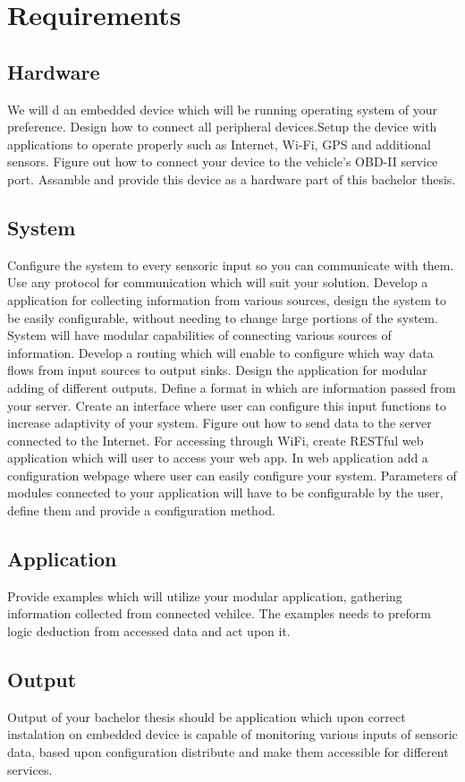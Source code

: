 \section{Requirements}

\subsection{Hardware}
We will d an embedded device which will be running operating system of your preference. Design how to connect all peripheral devices.Setup the device with applications to operate properly such as Internet, Wi-Fi, GPS and additional sensors. Figure out how to connect your device to the vehicle's OBD-II service port. Assamble and provide this device as a hardware part of this bachelor thesis.
\subsection{System}
Configure the system to every sensoric input so you can communicate with them. Use any protocol for communication which will suit your solution. Develop a application for collecting information from various sources, design the system to be easily configurable, without needing to change large portions of the system. System will have modular capabilities of connecting various sources of information. Develop a routing which will enable to configure which way data flows from input sources to output sinks. Design the application for modular adding of different outputs. Define a format in which are information passed from your server. Create an interface where user can configure this input functions to increase adaptivity of your system. Figure out how to send data to the server connected to the Internet. For accessing through WiFi, create RESTful web application which will user to access your web app. In web application add a configuration webpage where user can easily configure your system. Parameters of modules connected to your application will have to be configurable by the user, define them and provide a configuration method.
\subsection{Application}
Provide examples which will utilize your modular application, gathering information collected from connected vehilce. The examples needs to preform logic deduction from accessed data and act upon it.
\subsection{Output}
Output of your bachelor thesis should be application which upon correct instalation on embedded device is capable of monitoring various inputs of sensoric data, based upon configuration distribute and make them accessible for different services.




